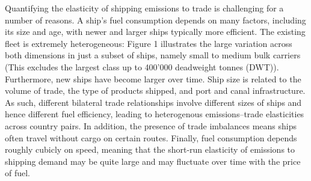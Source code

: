 \documentclass[hidelinks, 12pt,letterpaper]{article}
\begin{document}
Quantifying the elasticity of shipping emissions to trade is challenging for a number of reasons. A ship's fuel consumption depends on many factors, including its size and age, with newer and larger ships typically more efficient. The existing fleet is extremely heterogeneous: Figure 1 illustrates the large variation across both dimensions in just a subset of ships, namely small to medium bulk carriers (This excludes the largest class up to 400'000 deadweight tonnes (DWT)). Furthermore, new ships have become larger over time. Ship size is related to the volume of trade, the type of products shipped, and port and canal infrastructure. As such, different bilateral trade relationships involve different sizes of ships and hence different fuel efficiency, leading to heterogenous emissions--trade elasticities across country pairs. In addition, the presence of trade imbalances means ships often travel without cargo on certain routes. Finally, fuel consumption depends roughly cubicly on speed, meaning that the short-run elasticity of emissions to shipping demand may be quite large and may fluctuate over time with the price of fuel. 
\end{document}
